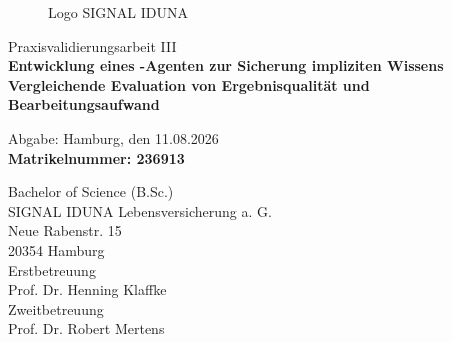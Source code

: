 \documentclass[
  10pt,
  ngerman,
  a4paper,
  toc=graduated,
  numbers=noenddot,
  headings=standardclasses,
  nonumberlist
]{scrartcl}
\begin{document}
\hypersetup{pageanchor=false}
\thispagestyle{empty}

\vspace{1cm}

\begin{figure}[htbp]
    \centering

    \begin{minipage}[t]{0.45\textwidth}
        \raggedright
        
        \captionsetup{justification=raggedright,singlelinecheck=false}
        \caption{Logo der BHH \cite{bhh_logo}}
        \label{fig:bhh_logo}
    \end{minipage}
    \hfill
    \begin{minipage}[t]{0.45\textwidth}
        \raggedleft
        
        \captionsetup{justification=raggedleft,singlelinecheck=false}
        \caption{Logo SIGNAL IDUNA \cite{signal_iduna_logo}}
        \label{fig:signal_iduna_logo}
    \end{minipage}

\end{figure}

\vspace{1cm}
\begin{center}
	{\Large Praxisvalidierungsarbeit III} \\
	\vspace{3cm}
	{\huge \textbf{Entwicklung eines -Agenten zur Sicherung impliziten Wissens}}\\
    \vspace{0.3cm}
    {\LARGE \textbf{{Vergleichende Evaluation von Ergebnisqualität und Bearbeitungsaufwand}}}\\
    
\end{center}

\vspace{1.5cm}
\begin{center}
	Abgabe: Hamburg, den 11.08.2026\\[3\baselineskip]
	\textbf{\textcolor{ihk_blue}{Matrikelnummer: 236913}}

    Bachelor of Science (B.Sc.) \\[4\baselineskip]

    SIGNAL IDUNA Lebensversicherung a. G. \\
    Neue Rabenstr. 15 \\
    20354 Hamburg \\[2\baselineskip]
	
	Erstbetreuung \\
    Prof. Dr. Henning Klaffke \\[2\baselineskip]

    Zweitbetreuung \\
    Prof. Dr. Robert Mertens \\

\end{center}
\end{document}
